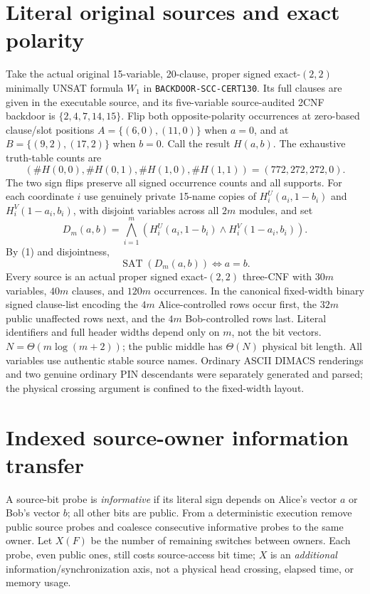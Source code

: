 \documentclass[11pt]{article}
\begin{document}
\section{Literal original sources and exact polarity}
Take the actual original 15-variable, 20-clause, proper signed exact-$(2,2)$ minimally UNSAT formula $W_1$ in \texttt{BACKDOOR-SCC-CERT130}. Its full clauses are given in the executable source, and its five-variable source-audited 2CNF backdoor is $\{2,4,7,14,15\}$. Flip both opposite-polarity occurrences at zero-based clause/slot positions $A=\{(6,0),(11,0)\}$ when $a=0$, and at $B=\{(9,2),(17,2)\}$ when $b=0$. Call the result $H(a,b)$. The exhaustive truth-table counts are
\[
(\#H(0,0),\#H(0,1),\#H(1,0),\#H(1,1))=(772,272,272,0).
\tag{1}
\]
The two sign flips preserve all signed occurrence counts and all supports. For each coordinate $i$ use genuinely private 15-name copies of $H_i^U(a_i,1-b_i)$ and $H_i^V(1-a_i,b_i)$, with disjoint variables across all $2m$ modules, and set
\[
D_m(a,b)=\bigwedge_{i=1}^m\left(H_i^U(a_i,1-b_i)\land H_i^V(1-a_i,b_i)\right).
\tag{2}
\]
By (1) and disjointness,
\[
\boxed{\operatorname{SAT}(D_m(a,b))\iff a=b.}\tag{3}
\]
Every source is an actual proper signed exact-$(2,2)$ three-CNF with $30m$ variables, $40m$ clauses, and $120m$ occurrences. In the canonical fixed-width binary signed clause-list encoding the $4m$ Alice-controlled rows occur first, the $32m$ public unaffected rows next, and the $4m$ Bob-controlled rows last. Literal identifiers and full header widths depend only on $m$, not the bit vectors. $N=\Theta(m\log(m+2))$; the public middle has $\Theta(N)$ physical bit length. All variables use authentic stable source names. Ordinary ASCII DIMACS renderings and two genuine ordinary PIN descendants were separately generated and parsed; the physical crossing argument is confined to the fixed-width layout.

\section{Indexed source-owner information transfer}
A source-bit probe is \emph{informative} if its literal sign depends on Alice's vector $a$ or Bob's vector $b$; all other bits are public. From a deterministic execution remove public source probes and coalesce consecutive informative probes to the same owner. Let $X(F)$ be the number of remaining switches between owners. Each probe, even public ones, still costs source-access bit time; $X$ is an \emph{additional} information/synchronization axis, not a physical head crossing, elapsed time, or memory usage.
\end{document}
